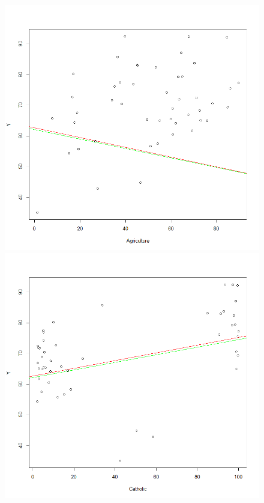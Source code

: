 \documentclass[a4paper,12pt]{article}
\begin{document}
\begin{figure}[H]
\centering
\begin{minipage}[]{0.24\textwidth}
  \includegraphics[width=\textwidth]{figures/Lab2A1_lr_A.png}  
 \end{minipage}
 \begin{minipage}[]{0.24\textwidth}
  \includegraphics[width=\textwidth]{figures/Lab2A1_lr_C.png}  

\end{minipage}
\end{figure}
\end{document}
